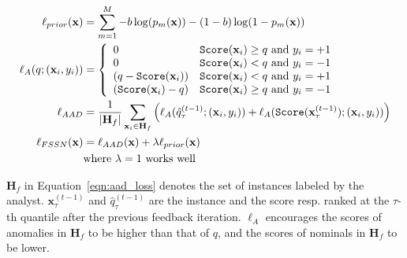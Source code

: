 \documentclass{article}
\begin{document}
\begin{align}
\ell_{prior}({\bf x}) &= \sum_{m=1}^M{-b\log(p_m({\bf x})) -(1 - b)\log(1 - p_m({\bf x}))} \label{eqn:prior} \\
\ell_A(q; ({\bf x}_i, y_i)) &= \left \{ 
\begin{array}{lr}
0 & \text{\texttt{Score}$({\bf x}_i)$} \ge q \text{ and $y_i=+1$} \\
0 & \text{\texttt{Score}$({\bf x}_i)$} < q \text{ and $y_i=-1$} \\
(q - \text{\texttt{Score}$({\bf x}_i)$}) & \text{\texttt{Score}$({\bf x}_i)$} < q \text{ and  $y_i=+1$} \\
(\text{\texttt{Score}$({\bf x}_i)$} - q) & \text{\texttt{Score}$({\bf x}_i)$} \ge q \text{ and $y_i=-1$}
\end{array} 
\right. \label{eqn:loss_x_loss} \\
\ell_{AAD} &= \frac{1}{|{\bf H}_f|} \sum_{{\bf x}_i \in {\bf H}_f} \left( \ell_A(\hat{q}_{\tau}^{(t-1)}; ({\bf x}_i, y_i)) + \ell_A(\text{\texttt{Score}}({\bf x}_{\tau}^{(t-1)}); ({\bf x}_i, y_i)) \right) \label{eqn:aad_loss} \\
\ell_{FSSN}({\bf x}) &= \ell_{AAD}({\bf x}) + \lambda \ell_{prior}({\bf x}) \label{eqn:l_fssn} \\
& \text{where $\lambda=1$ works well} \nonumber
\end{align}

$\mathbf{H}_f$ in Equation~\ref{eqn:aad_loss} denotes the set of instances labeled by the analyst. ${\mathbf x}_{\tau}^{(t-1)}$ and $\hat{q}_{\tau}^{(t-1)}$ are the instance and the score resp. ranked at the $\tau$-th quantile after the previous feedback iteration. $\ell_{A}$ encourages the scores of anomalies in $\mathbf{H}_f$ to be higher than that of $q$, and the scores of nominals in $\mathbf{H}_f$ to be lower.
\end{document}
